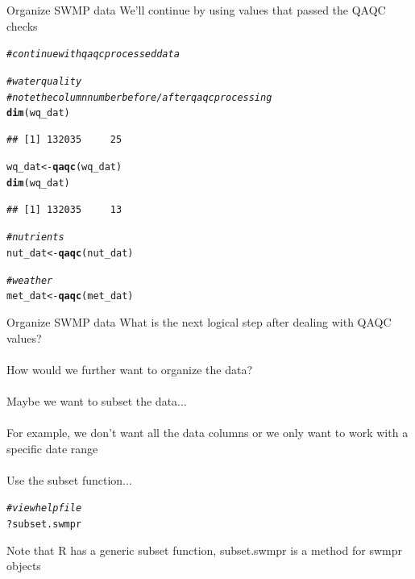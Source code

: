 \documentclass[xcolor=svgnames]{beamer}\usepackage[]{graphicx}\usepackage[]{color}
\makeatletter
\newcommand{\hlcom}[1]{\textcolor[rgb]{0.678,0.584,0.686}{\textit{#1}}}%
\newcommand{\hlopt}[1]{\textcolor[rgb]{0,0,0}{#1}}%
\newcommand{\hlstd}[1]{\textcolor[rgb]{0.345,0.345,0.345}{#1}}%
\newcommand{\hlkwb}[1]{\textcolor[rgb]{0.69,0.353,0.396}{#1}}%
\newcommand{\hlkwd}[1]{\textcolor[rgb]{0.737,0.353,0.396}{\textbf{#1}}}%
\newenvironment{kframe}{%
 \def\at@end@of@kframe{}%
 \ifinner\ifhmode%
  \def\at@end@of@kframe{\end{minipage}}%
  \begin{minipage}{\columnwidth}%
 \fi\fi%
 \def\FrameCommand##1{\hskip\@totalleftmargin \hskip-\fboxsep
 \colorbox{shadecolor}{##1}\hskip-\fboxsep
     \hskip-\linewidth \hskip-\@totalleftmargin \hskip\columnwidth}%
 \MakeFramed {\advance\hsize-\width
   \@totalleftmargin\z@ \linewidth\hsize
   \@setminipage}}%
 {\par\unskip\endMakeFramed%
 \at@end@of@kframe}
\newenvironment{knitrout}{}{} %
\makeatother
\begin{document}
\begin{frame}[containsverbatim]{Organize SWMP data}
We'll continue by using values that passed the QAQC checks
\begin{knitrout}\scriptsize
{}\color{fgcolor}\begin{kframe}
\begin{alltt}
\hlcom{# continue with qaqc processed data}

\hlcom{# water quality}
\hlcom{# note the column number before/after qaqc processing}
\hlkwd{dim}\hlstd{(wq_dat)}
\end{alltt}
\begin{verbatim}
## [1] 132035     25
\end{verbatim}
\begin{alltt}
\hlstd{wq_dat} \hlkwb{<-} \hlkwd{qaqc}\hlstd{(wq_dat)}
\hlkwd{dim}\hlstd{(wq_dat)}
\end{alltt}
\begin{verbatim}
## [1] 132035     13
\end{verbatim}
\begin{alltt}
\hlcom{# nutrients}
\hlstd{nut_dat} \hlkwb{<-} \hlkwd{qaqc}\hlstd{(nut_dat)}

\hlcom{# weather}
\hlstd{met_dat} \hlkwb{<-} \hlkwd{qaqc}\hlstd{(met_dat)}
\end{alltt}
\end{kframe}
\end{knitrout}
\end{frame}

\begin{frame}[containsverbatim]{Organize SWMP data}
What is the next logical step after dealing with QAQC values? \\~\\
How would we further want to organize the data? \\~\\
Maybe we want to subset the data... \\~\\
For example, we don't want all the data columns or we only want to work with a specific date range \\~\\
Use the subset function...
\begin{knitrout}\scriptsize
{}\color{fgcolor}\begin{kframe}
\begin{alltt}
\hlcom{# view help file}
\hlopt{?}\hlstd{subset.swmpr}
\end{alltt}
\end{kframe}
\end{knitrout}
Note that R has a generic subset function, subset.swmpr is a method for swmpr objects
\end{frame}
\end{document}
